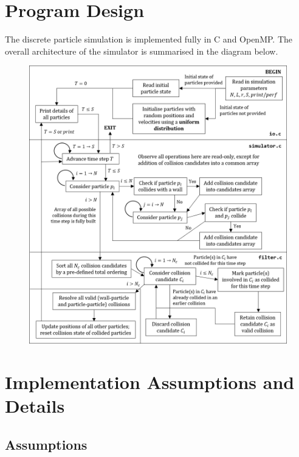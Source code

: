 \documentclass[12pt]{article}
\begin{document}
\maketitle
\setcounter{tocdepth}{1}
\tableofcontents

\pagebreak
\section{Program Design}

The discrete particle simulation is implemented fully in C and OpenMP. The overall architecture of the simulator is summarised in the diagram below.

\begin{figure}[hb]
\includegraphics{./reportAssets/chap1Flowchart}
\centering
\end{figure}

\pagebreak

\section{Implementation Assumptions and Details}

\subsection{Assumptions}
\end{document}

